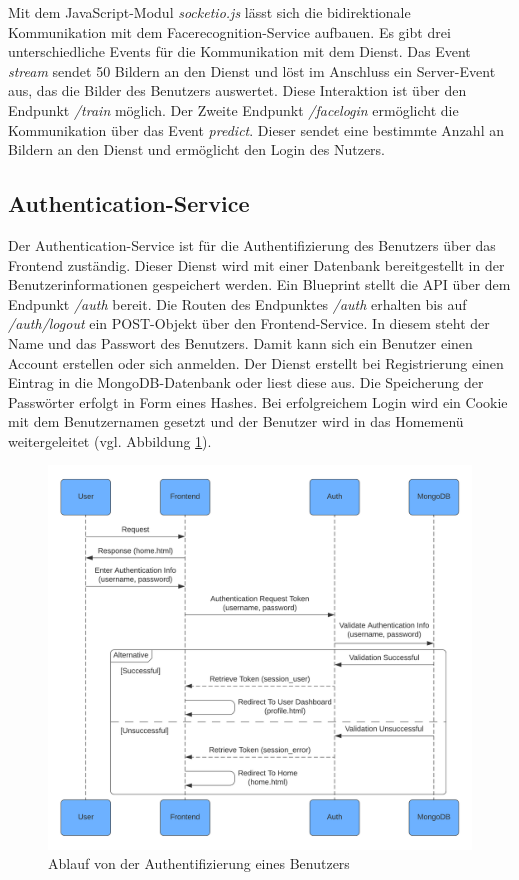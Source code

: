 Mit dem JavaScript-Modul \textit{socketio.js} lässt sich die bidirektionale Kommunikation mit dem Facerecognition-Service aufbauen.
Es gibt drei unterschiedliche Events für die Kommunikation mit dem Dienst.
Das Event \textit{stream} sendet 50 Bildern an den Dienst und löst im Anschluss ein Server-Event aus, das die Bilder des Benutzers auswertet.
Diese Interaktion ist über den Endpunkt \textit{/train} möglich.
Der Zweite Endpunkt \textit{/facelogin} ermöglicht die Kommunikation über das Event \textit{predict}.
Dieser sendet eine bestimmte Anzahl an Bildern an den Dienst und ermöglicht den Login des Nutzers.


\subsection{Authentication-Service}
Der Authentication-Service ist für die Authentifizierung des Benutzers über das Frontend zuständig.
Dieser Dienst wird mit einer Datenbank bereitgestellt in der Benutzerinformationen gespeichert werden.
Ein Blueprint stellt die API über dem Endpunkt \textit{/auth} bereit.
Die Routen des Endpunktes \textit{/auth} erhalten bis auf \textit{/auth/logout} ein POST-Objekt über den Frontend-Service.
In diesem steht der Name und das Passwort des Benutzers.
Damit kann sich ein Benutzer einen Account erstellen oder sich anmelden.
Der Dienst erstellt bei Registrierung einen Eintrag in die MongoDB-Datenbank oder liest diese aus.
Die Speicherung der Passwörter erfolgt in Form eines Hashes.
Bei erfolgreichem Login wird ein Cookie mit dem Benutzernamen gesetzt und der Benutzer wird in das Homemenü weitergeleitet (vgl. Abbildung \ref{fig:authenticationsequence}).

\begin{figure}[!htb]
  \centering
  \includegraphics[width=0.8\columnwidth]{images/UMLAuthenticationService.png}
  \caption{Ablauf von der Authentifizierung eines Benutzers}
  \label{fig:authenticationsequence}
\end{figure}

